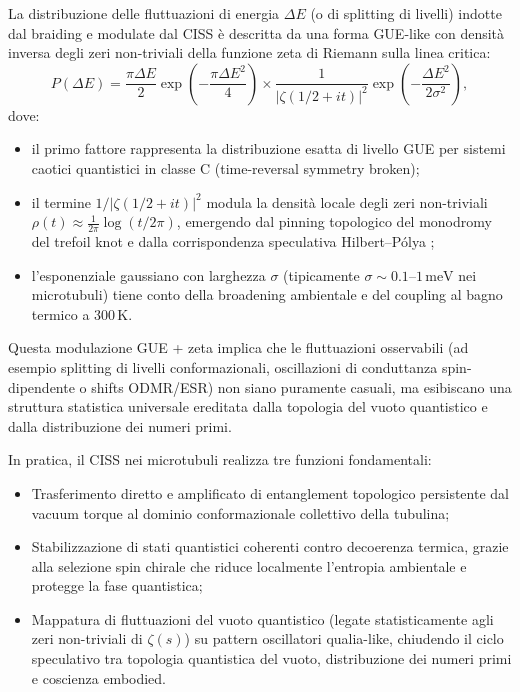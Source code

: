 \documentclass[11pt,a4paper]{article}
\let\oldcite\cite
\renewcommand{\cite}{\protect\oldcite}
\theoremstyle{plain}
\theoremstyle{definition}
\begin{document}
La distribuzione delle fluttuazioni di energia $\Delta E$ (o di splitting di livelli) indotte dal braiding e modulate dal CISS è descritta da una forma GUE-like con densità inversa degli zeri non-triviali della funzione zeta di Riemann sulla linea critica:
\begin{equation}
P(\Delta E) = \frac{\pi \Delta E}{2} \exp\left( -\frac{\pi \Delta E^2}{4} \right) \times \frac{1}{|\zeta(1/2 + i t)|^2} \exp\left( -\frac{\Delta E^2}{2 \sigma^2} \right),
\label{eq:ciss-fluctuations-gue-full}
\end{equation}
dove:
\begin{itemize}
    \item il primo fattore rappresenta la distribuzione esatta di livello GUE per sistemi caotici quantistici in classe C (time-reversal symmetry broken);
    \item il termine $1/|\zeta(1/2 + i t)|^2$ modula la densità locale degli zeri non-triviali $\rho(t) \approx \frac{1}{2\pi} \log(t/2\pi)$, emergendo dal pinning topologico del monodromy del trefoil knot e dalla corrispondenza speculativa Hilbert–Pólya \cite{berry1987riemann, keating1993riemann};
    \item l'esponenziale gaussiano con larghezza $\sigma$ (tipicamente $\sigma \sim 0.1$--$1\,\mathrm{meV}$ nei microtubuli) tiene conto della broadening ambientale e del coupling al bagno termico a 300\,K.
\end{itemize}

Questa modulazione GUE + zeta implica che le fluttuazioni osservabili (ad esempio splitting di livelli conformazionali, oscillazioni di conduttanza spin-dipendente o shifts ODMR/ESR) non siano puramente casuali, ma esibiscano una struttura statistica universale ereditata dalla topologia del vuoto quantistico e dalla distribuzione dei numeri primi. 

\vspace{0.3cm}

In pratica, il CISS nei microtubuli realizza tre funzioni fondamentali:
\begin{itemize}
    \item Trasferimento diretto e amplificato di entanglement topologico persistente dal vacuum torque al dominio conformazionale collettivo della tubulina;
    \item Stabilizzazione di stati quantistici coherenti contro decoerenza termica, grazie alla selezione spin chirale che riduce localmente l'entropia ambientale e protegge la fase quantistica;
    \item Mappatura di fluttuazioni del vuoto quantistico (legate statisticamente agli zeri non-triviali di $\zeta(s)$) su pattern oscillatori qualia-like, chiudendo il ciclo speculativo tra topologia quantistica del vuoto, distribuzione dei numeri primi e coscienza embodied.
\end{itemize}
\end{document}
